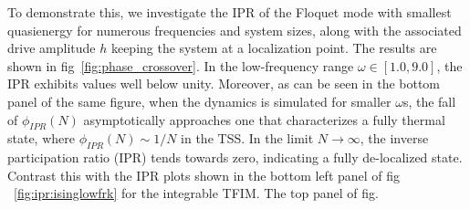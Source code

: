 \documentclass[%
reprint,
superscriptaddress,
amsmath,amssymb,
aps,
prb,
showkeys,
]{revtex4-2}
\providecommand{\DIFaddtex}[1]{{\protect\color{blue}\uwave{#1}}} %
\providecommand{\DIFaddbegin}{} %
\providecommand{\DIFaddend}{} %
\providecommand{\DIFdelbegin}{} %
\providecommand{\DIFdelend}{} %
\providecommand{\DIFadd}[1]{\texorpdfstring{\DIFaddtex{#1}}{#1}} %
\newcommand{\DIFscaledelfig}{0.5}
\newlength{\DIFdelgraphicswidth} %
\newlength{\DIFdelgraphicsheight} %
\newcommand{\DIFaddincludegraphics}[2][]{{\color{blue}\fbox{\DIFOincludegraphics[#1]{#2}}}} %
\newcommand{\DIFdelincludegraphics}[2][]{%
\sbox{\DIFdelgraphicsbox}{\DIFOincludegraphics[#1]{#2}}%
\settoboxwidth{\DIFdelgraphicswidth}{\DIFdelgraphicsbox} %
\settoboxtotalheight{\DIFdelgraphicsheight}{\DIFdelgraphicsbox} %
\scalebox{\DIFscaledelfig}{%
\parbox[b]{\DIFdelgraphicswidth}{\usebox{\DIFdelgraphicsbox}\\[-\baselineskip] \rule{\DIFdelgraphicswidth}{0em}}\llap{\resizebox{\DIFdelgraphicswidth}{\DIFdelgraphicsheight}{%
\setlength{\unitlength}{\DIFdelgraphicswidth}%
\begin{picture}(1,1)%
\thicklines\linethickness{2pt} %
{\color[rgb]{1,0,0}\put(0,0){\framebox(1,1){}}}%
{\color[rgb]{1,0,0}\put(0,0){\line( 1,1){1}}}%
{\color[rgb]{1,0,0}\put(0,1){\line(1,-1){1}}}%
\end{picture}%
}\hspace*{3pt}}} %
} %
\DeclareRobustCommand{\DIFaddbegin}{\DIFOaddbegin \let\includegraphics\DIFaddincludegraphics} %
\DeclareRobustCommand{\DIFaddend}{\DIFOaddend \let\includegraphics\DIFOincludegraphics} %
\DeclareRobustCommand{\DIFdelbegin}{\DIFOdelbegin \let\includegraphics\DIFdelincludegraphics} %
\DeclareRobustCommand{\DIFdelend}{\DIFOaddend \let\includegraphics\DIFOincludegraphics} %
\begin{document}
To demonstrate this, we investigate the IPR of the  Floquet mode with smallest quasienergy for numerous frequencies and system sizes, along with the associated drive amplitude $h$ keeping the system at a localization point. The results are shown in fig\DIFaddbegin \DIFadd{.}\DIFaddend ~\ref{fig:phase_crossover}. In the low-frequency range $\omega \in \left[1.0, 9.0\right]$, the IPR exhibits values well below unity.   {Moreover, as can be seen in the bottom panel of the same figure, when the dynamics is simulated for smaller} $\omega$s, {the fall of} $\phi_{IPR}(N)$ {asymptotically approaches one that characterizes a fully thermal state, where} $\phi_{IPR}(N)\sim 1/N$ {in the TSS. } In the limit  $N\rightarrow\infty$, the inverse participation ratio (IPR) tends towards zero, indicating a fully de-localized state. \DIFdelbegin %
\DIFdelend Contrast this with the IPR plots shown in the bottom left panel of fig\DIFdelbegin %
\DIFdelend \DIFaddbegin \DIFadd{.}\DIFaddend ~\ref{fig:ipr:isinglowfrk} {for the integrable TFIM}.  \DIFdelbegin %
\DIFdelend The top panel of fig.\DIFdelbegin %
\end{document}
